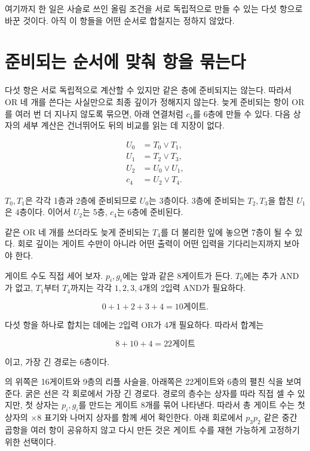 여기까지 한 일은 사슬로 쓰인 올림 조건을 서로 독립적으로 만들 수 있는 다섯 항으로 바꾼 것이다. 아직 이 항들을 어떤 순서로 합칠지는 정하지 않았다.

\section{준비되는 순서에 맞춰 항을 묶는다}

다섯 항은 서로 독립적으로 계산할 수 있지만 같은 층에 준비되지는 않는다. 따라서 OR 네 개를 쓴다는 사실만으로 최종 깊이가 정해지지 않는다. 늦게 준비되는 항이 OR를 여러 번 더 지나지 않도록 묶으면, 아래 연결처럼 \(c_4\)를 6층에 만들 수 있다. 다음 상자의 세부 계산은 건너뛰어도 뒤의 비교를 읽는 데 지장이 없다.

\begin{infobox}[선택 읽기: 6층을 직접 확인하기]
\[
\begin{aligned}
  U_0&=T_0\lor T_1,\\
  U_1&=T_2\lor T_3,\\
  U_2&=U_0\lor U_1,\\
  c_4&=U_2\lor T_4.
\end{aligned}
\]

\(T_0,T_1\)은 각각 1층과 2층에 준비되므로 \(U_0\)는 3층이다. 3층에 준비되는 \(T_2,T_3\)을 합친 \(U_1\)은 4층이다. 이어서 \(U_2\)는 5층, \(c_4\)는 6층에 준비된다.
\end{infobox}

같은 OR 네 개를 쓰더라도 늦게 준비되는 \(T_4\)를 더 불리한 잎에 놓으면 7층이 될 수 있다. 회로 깊이는 게이트 수만이 아니라 어떤 출력이 어떤 입력을 기다리는지까지 보아야 한다.

게이트 수도 직접 세어 보자. \(p_i,g_i\)에는 앞과 같은 8게이트가 든다. \(T_0\)에는 추가 AND가 없고, \(T_1\)부터 \(T_4\)까지는 각각 \(1,2,3,4\)개의 2입력 AND가 필요하다.

\[
  0+1+2+3+4=10\text{게이트}.
\]

다섯 항을 하나로 합치는 데에는 2입력 OR가 4개 필요하다. 따라서 합계는

\[
  8+10+4=22\text{게이트}
\]

이고, 가장 긴 경로는 6층이다.



의 위쪽은 16게이트와 9층의 리플 사슬을, 아래쪽은 22게이트와 6층의 펼친 식을 보여 준다. 굵은 선은 각 회로에서 가장 긴 경로다. 경로의 층수는 상자를 따라 직접 셀 수 있지만, 첫 상자는 \(p_i,g_i\)를 만드는 게이트 8개를 묶어 나타낸다. 따라서 총 게이트 수는 첫 상자의 \(\times8\) 표기와 나머지 상자를 함께 세어 확인한다. 아래 회로에서 \(p_3p_2\) 같은 중간 곱항을 여러 항이 공유하지 않고 다시 만든 것은 게이트 수를 재현 가능하게 고정하기 위한 선택이다.

